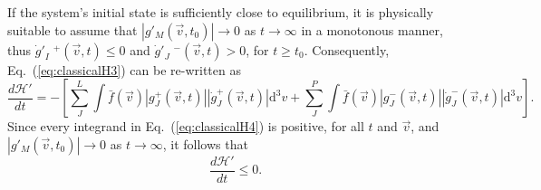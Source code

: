 \begin{comment}
Cells with ${{\dot{g}}'}_I\phantom{.}\!^{+}(\vec{v},t)$, $I=1,\,\dots\,,L$, 
have an excess of particles and/or energy (relative to the mean value in equilibrium).
In contrast, cells with ${{\dot{g}}'}_J\phantom{.}\!^{-}(\vec{v},t)$, $J=1,\,\dots\,,P$,
have a scarcity of particles and/or energy
(relative to the mean value in equilibrium).
In addition, $\dot{g}^{+}_{J}$ represents the
change on the deviation on cells that have an excess of particles or energy
while $\dot{g}^{-}_{J}$  represents the change on the deviations on cells that
have missing particles or energy.
On the other hand, $g^{+}_{J}$  represents the value of the deviation on cells
that have an excess of particles or energy. In contrast, $g^{-}_{J}$ represents
the value of the deviation on cells that have missing particles or energy.
Also, on the one hand, $\dot{g}^{+}_{J}<0$ describes the loss of particles
and/or energy and so, $g^{+}_{J}>0$. On the other hand, $\dot{g}^{-}_{J}>0$
describes the gain of particles and/or energy and therefore $g^{-}_{J}<0$.

We sort the previous ideas in the following form
%
\begin{equation}\label{separacionclassical}
\begin{array}{rl}
  g^{+}_{J}=+|g^{+}_{J}|; & \dot{g}^{+}_{J}=-|\dot{g}^{+}_{J}|,\\
  g^{-}_{J}=-|g^{-}_{J}|; & \dot{g}^{-}_{J}=+|\dot{g}^{-}_{J}|,
 \end{array}
\end{equation}
%
and consequently, (\ref{classicalH3}) obtains the following form


We can observe that $\bar{f}(\vec{v})$ in (\ref{eq:classicalH4}) is always
positive. Also the deviation and its derivative are positive, then all the
expression is positive. However, the global sign makes the derivative of the
$\mathcal{H}'$ with respect to time is always less to zero. With this we proved that
$\frac{d\mathcal{H}'}{dt}<0$. If the system is in equilibrium,
$g_{J}(\vec{v},t)=\dot g_J(\vec{v},t)=0$, therefore $\frac{d\mathcal{H}'}{dt}=0$.
\end{comment}
%
If the system's initial state is sufficiently close to equilibrium, it is
physically suitable
to assume that $\left|g'_M(\vec{v},t_0)\right|\to 0$ as $t\to\infty$ in a monotonous manner,
thus ${{\dot{g}}'}_I\phantom{.}\!^{+}(\vec{v},t)\leq0$ and
${{\dot{g}}'}_J\phantom{.}\!^{-}(\vec{v},t)>0$, for $t\geq t_0$. Consequently,
Eq.~(\ref{eq:classicalH3}) can be re-written as
%
\begin{equation}\label{eq:classicalH4}
    \frac{d\mathcal{H}'}{dt}=-\left[
      \sum_J^{L}\int\bar f(\vec{v})|g_J^{+}(\vec{v},t)|
        |\dot g_J^{+}(\vec{v},t)|\mathrm{d}^3v
      +\sum_J^{P}\int\bar f(\vec{v})|g_J^{-}(\vec{v},t)|
      |\dot g_J^{-}(\vec{v},t)|\mathrm{d}^3v 
    \right].
\end{equation}
%
Since every integrand in Eq.~(\ref{eq:classicalH4}) is positive,
for all $t$ and $\vec v$, and
$\left|g'_M(\vec{v},t_0)\right|\to 0$ as $t\to\infty$, it follows that
%
\begin{equation}\label{eq:dHpdtleq0}
 \frac{d\mathcal{H}'}{dt}\leq0.
\end{equation}
%

